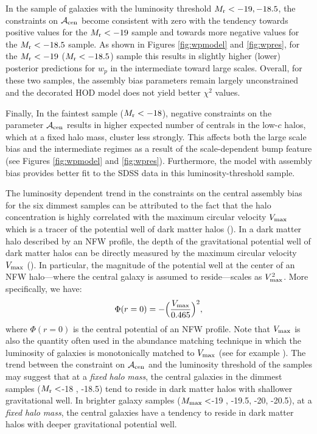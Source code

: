 \documentclass[12pt, preprint]{aastex}
\newcommand{\beq}{\begin{equation}}
\newcommand{\eeq}{\end{equation}}
\newcommand{\acen}{\mathcal{A}_{\rm cen}}
\begin{document}
In the sample of galaxies with the luminosity threshold $M_{\rm r} < -19, -18.5$, the constraints on $\acen$ become consistent with zero with the tendency towards positive values for the $M_{\rm r}<-19$ sample and towards more negative values for the $M_{\rm r }<-18.5$ sample. As shown in Figures \ref{fig:wpmodel} and \ref{fig:wpres}, for the $M_{\rm r}<-19$ ($M_{\rm r}<-18.5$) sample this results in slightly higher (lower) posterior predictions for $w_{p}$ in the intermediate toward large scales. Overall, for these two samples, the assembly bias parameters remain largely unconstrained and the decorated HOD model does not yield better $\chi^{2}$ values. 

Finally, In the faintest sample ($M_{\rm r} < -18$), negative constraints on the parameter $\acen$ results in higher expected number of centrals in the low-$c$ halos, which at a fixed halo mass, cluster less strongly. This affects both the large scale bias and the intermediate regimes as a result of the scale-dependent bump feature (see Figures \ref{fig:wpmodel} and \ref{fig:wpres}). Furthermore, the model with assembly bias provides better fit to the SDSS data in this luminosity-threshold sample. 

The luminosity dependent trend in the constraints on the central assembly bias for the six dimmest samples can be attributed to the fact that the halo concentration is highly correlated with the maximum circular velocity $V_{\rm max}$ which is a tracer of the potential well of dark matter halos (\citealt{prada2012}). In a dark matter halo described by an NFW profile, the depth of the gravitational potential well of dark matter halos can be directly measured by the maximum circular velocity $V_{\rm max}$ (\citealt{vmax_potential}). In particular, the magnitude of the potential well at the center of an NFW halo---where the central galaxy is assumed to reside---scales as $V_{\rm max}^{2}$. More specifically, we have:
\beq
\Phi(r=0) = -\Big(\frac{V_{\rm max}}{0.465}\Big)^{2},
\eeq
 where $\Phi(r=0)$ is the central potential of an NFW profile. Note that $V_{\rm max}$ is also the quantity often used in the abundance matching technique in which the luminosity of galaxies is monotonically matched to $V_{\rm max}$ (see for example \citealt{reddick2013,lehman2015, hod_vs_sham, halodemographic}). The trend between the constraint on $\acen$ and the luminosity threshold of the samples may suggest that at a \emph{fixed} \emph{halo} \emph{mass}, the central galaxies in the dimmest samples ($M_{\rm r}<$-18 , -18.5) tend to reside in dark matter halos with shallower gravitational well. In brighter galaxy samples ($M_{\rm max}<$-19 , -19.5, -20, -20.5), at a \emph{fixed} \emph{halo} \emph{mass}, the central galaxies have a tendency to reside in dark matter halos with deeper gravitational potential well. 
\end{document}
